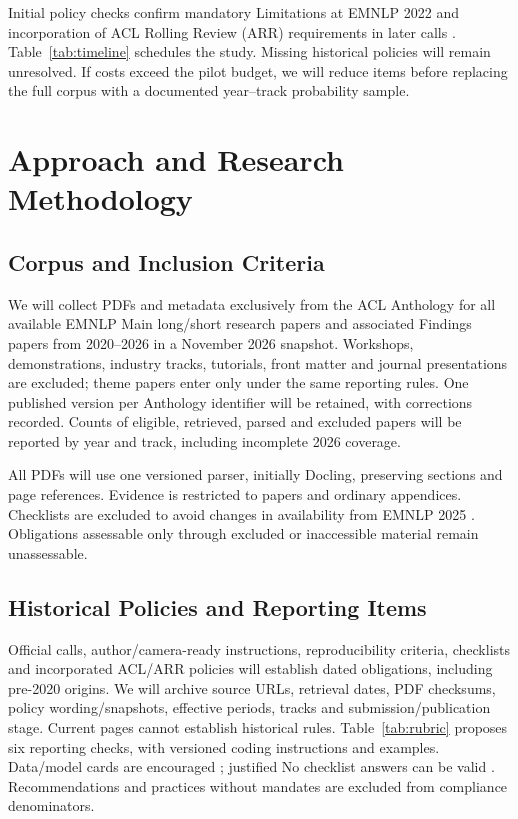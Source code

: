 \documentclass[11pt]{article}
\begin{document}
Initial policy checks confirm mandatory Limitations at EMNLP 2022 \cite{emnlp2022cfp} and incorporation of ACL Rolling Review (ARR) requirements in later calls \cite{emnlp2025cfp,emnlp2026cfp}. Table~\ref{tab:timeline} schedules the study. Missing historical policies will remain unresolved. If costs exceed the pilot budget, we will reduce items before replacing the full corpus with a documented year--track probability sample.

\section{Approach and Research Methodology}
\label{sec:methods}
\subsection{Corpus and Inclusion Criteria}
We will collect PDFs and metadata exclusively from the ACL Anthology for all available EMNLP Main long/short research papers and associated Findings papers from 2020--2026 in a November 2026 snapshot. Workshops, demonstrations, industry tracks, tutorials, front matter and journal presentations are excluded; theme papers enter only under the same reporting rules. One published version per Anthology identifier will be retained, with corrections recorded. Counts of eligible, retrieved, parsed and excluded papers will be reported by year and track, including incomplete 2026 coverage.

All PDFs will use one versioned parser, initially Docling, preserving sections and page references. Evidence is restricted to papers and ordinary appendices. Checklists are excluded to avoid changes in availability from EMNLP 2025 \cite{arrpublic2025}. Obligations assessable only through excluded or inaccessible material remain unassessable.

\subsection{Historical Policies and Reporting Items}
Official calls, author/camera-ready instructions, reproducibility criteria, checklists and incorporated ACL/ARR policies will establish dated obligations, including pre-2020 origins. We will archive source URLs, retrieval dates, PDF checksums, policy wording/snapshots, effective periods, tracks and submission/publication stage. Current pages cannot establish historical rules. Table~\ref{tab:rubric} proposes six reporting checks, with versioned coding instructions and examples. Data/model cards are encouraged \cite{arrchecklist}; justified No checklist answers can be valid \cite{arrresponsible}. Recommendations and practices without mandates are excluded from compliance denominators.
\end{document}
